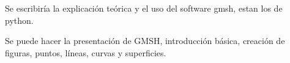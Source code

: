 Se escribiría la explicación teórica y el uso del software gmsh, estan los de python.


Se puede hacer la presentación de GMSH, introducción básica, creación de figuras, puntos, líneas, curvas y superficies.

